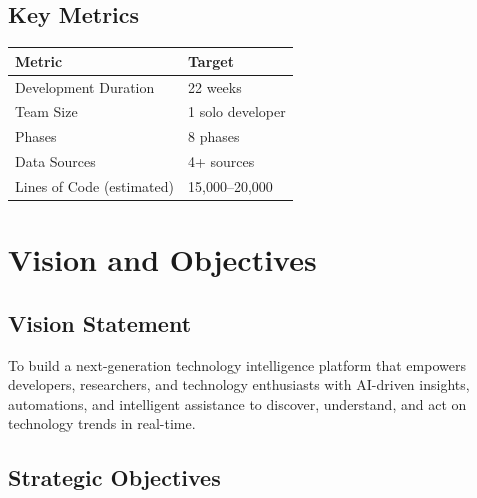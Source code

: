 \documentclass[12pt,oneside]{report}
\begin{document}
\section{Key Metrics}

\begin{table}[h]
\centering
\begin{tabular}{|l|l|}
\hline
\rowcolor{lightblue}
\textbf{Metric} & \textbf{Target} \\
\hline
Development Duration & 22 weeks \\
Team Size & 1 solo developer \\
Phases & 8 phases \\
Data Sources & 4+ sources \\
Lines of Code (estimated) & 15,000--20,000 \\
\hline
\end{tabular}
\end{table}

\chapter{Vision and Objectives}

\section{Vision Statement}

To build a next-generation technology intelligence platform that empowers developers, researchers, and technology enthusiasts with AI-driven insights, automations, and intelligent assistance to discover, understand, and act on technology trends in real-time.

\section{Strategic Objectives}
\end{document}
